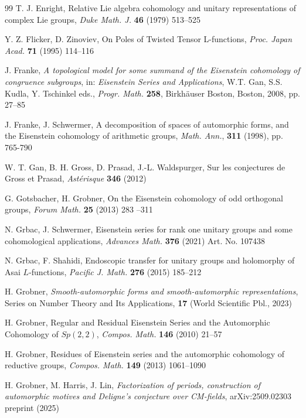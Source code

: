 \documentclass[a4paper,10pt]{amsart}
\theoremstyle{definition}
\numberwithin{equation}{section}
\begin{document}
\begin{thebibliography}{99}
 T. J. Enright, Relative Lie algebra cohomology and unitary representations of complex Lie groups, {\it Duke Math. J.} {\bf 46} (1979) 513--525

 Y. Z. Flicker, D. Zinoviev, On Poles of Twisted Tensor L-functions, {\it Proc. Japan Acad.} {\bf 71} (1995) 114--116

 J. Franke, {\it A topological model for some summand of the Eisenstein cohomology of congruence subgroups}, in: {\it Eisenstein Series and Applications}, W.T. Gan, S.S. Kudla, Y. Tschinkel eds., {\it Progr. Math.} {\bf 258}, Birkh\"{a}user Boston, Boston, 2008, pp. 27--85


 J. Franke, J. Schwermer, A decomposition of spaces of automorphic forms, and the Eisenstein cohomology of arithmetic groups, {\it Math. Ann.}, \textbf{311} (1998), pp. 765-790


 W. T. Gan, B. H. Gross, D. Prasad, J.-L. Waldspurger, Sur les conjectures de Gross et Prasad, {\it Ast\'erisque} {\bf 346} (2012)


 G. Gotsbacher, H. Grobner, On the Eisenstein cohomology of odd orthogonal groups, {\it Forum Math.} {\bf 25} (2013) 283 --311

 N. Grbac, J. Schwermer, Eisenstein series for rank one unitary groups and some cohomological applications, {\it Advances Math.} {\bf 376} (2021) Art. No. 107438

 N. Grbac, F. Shahidi, Endoscopic transfer for unitary groups and holomorphy of Asai $L$-functions, {\it Pacific J. Math.} {\bf 276} (2015) 185--212 


 H. Grobner, {\it Smooth-automorphic forms and smooth-automorphic representations}, Series on Number Theory and Its Applications, {\bf 17} (World Scientific Pbl., 2023)


 H. Grobner, Regular and Residual Eisenstein Series and the Automorphic Cohomology of $Sp(2,2)$, {\it Compos. Math.} {\bf 146} (2010) 21--57

 H. Grobner, Residues of Eisenstein series and the automorphic cohomology of reductive groups, {\it Compos. Math.} {\bf 149} (2013) 1061--1090


 H. Grobner, M. Harris, J. Lin, {\it Factorization of periods, construction of automorphic motives and Deligne's conjecture over CM-fields},  	arXiv:2509.02303 preprint (2025)



\end{thebibliography}
\end{document}
